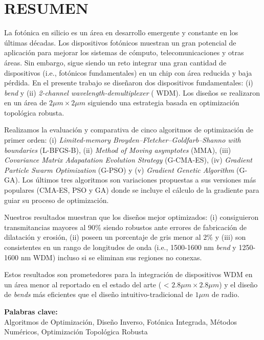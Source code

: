 \chapter*{\center \Large \vspace{-4.5cm} RESUMEN}

La fotónica en silicio es un área en desarrollo emergente y constante en los últimas décadas. Los dispositivos fotónicos muestran un gran potencial de aplicación para mejorar
los sistemas de cómputo, telecomunicaciones y otras áreas.
Sin embargo, sigue siendo un reto integrar una gran cantidad de dispositivos (i.e., fotónicos fundamentales) en un chip con área reducida y baja pérdida. 
En el presente trabajo se diseñaron dos dispositivos fundamentales: (i) \emph{bend} y (ii) \emph{2-channel wavelength-demultiplexer} ( WDM).
Los diseños se realizaron en un área de $2 \mu m \times 2 \mu m$
siguiendo una estrategia basada en optimización topológica robusta.


Realizamos la evaluación y comparativa de cinco algoritmos de optimización de primer orden: 
(i) \emph{Limited-memory Broyden–Fletcher–Goldfarb–Shanno with boundaries} (L-BFGS-B), 
(ii) \emph{Method of Moving asymptotes} (MMA), 
(iii) \emph{Covariance Matrix Adapatation Evolution Strategy} (G-CMA-ES), (iv) \emph{Gradient Particle Swarm Optimization} (G-PSO) y (v) \emph{Gradient Genetic Algorithm} (G-GA). Los últimos tres algoritmos son variaciones propuestas a sus versiones
más populares (CMA-ES, PSO y GA) donde se incluye el cálculo de
la gradiente para guiar su proceso de optimización.

Nuestros resultados muestran que los diseños mejor optimizados: (i) consiguieron transmitancias mayores al $90 \%$ siendo robustos ante errores
de fabricación de dilatación y erosión, (ii) poseen un porcentaje de gris menor al $2 \%$
y (iii) son consistentes en un rango de longitudes de onda (i.e., 1500-1600 nm \emph{bend} y 1250-1600 nm WDM) incluso si se eliminan sus regiones no conexas. 

Estos resultados son prometedores para la integración de dispositivos  WDM en un área menor al reportado en el estado del arte ( < $2.8 \mu m \times 2.8 \mu m$) y el diseño de \emph{bends} más eficientes que el diseño intuitivo-tradicional de $1 \mu m$ de radio.

\noindent \textbf{Palabras clave:}\\
\noindent Algoritmos de Optimización, Diseño Inverso, Fotónica Integrada, Métodos Numéricos, Optimización Topológica Robusta
